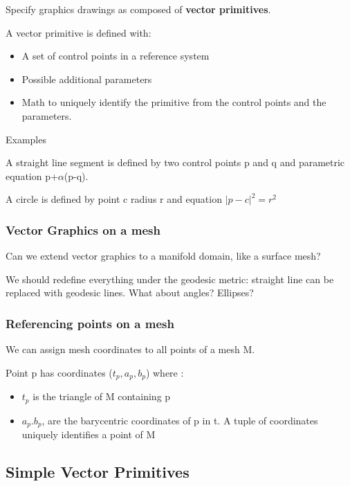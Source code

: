 \documentclass{article}
\begin{document}
Specify graphics drawings as composed of \textbf{vector primitives}.

A vector primitive is defined with:

\begin{itemize}
    \item A set of control points in a reference system
    \item Possible additional parameters
    \item Math to uniquely identify the primitive from the control points and the parameters.
\end{itemize}

Examples

A straight line segment is defined by two control points p and q and parametric equation p+$\alpha$(p-q).

A circle is defined by point c radius r and equation $|p-c|^2 = r^2$


\subsubsection{Vector Graphics on a mesh}

Can we extend vector graphics to a manifold domain, like a surface mesh?

We should redefine everything under the geodesic metric: straight line can be replaced with geodesic lines. What about angles? Ellipses? 


\subsubsection{Referencing points on a mesh}

We can assign mesh coordinates to all points of a mesh M.

Point p has coordinates ($t_p,a_p,b_p$) where :

\begin{itemize}
    \item $t_p$ is the triangle of M containing p
    \item $a_p.b_p$, are the barycentric coordinates of p in t. A tuple of coordinates uniquely identifies a point of M
\end{itemize}

\vspace{60mm}

\subsection{Simple Vector Primitives}
\end{document}
